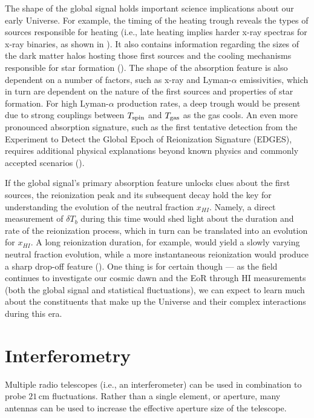 The shape of the global signal holds important science implications about our early Universe. For example, the timing of the heating trough reveals the types of sources responsible for heating (i.e., late heating implies harder x-ray spectras for x-ray binaries, as shown in \citet{fialkov_et_al2014}). It also contains information regarding the sizes of the dark matter halos hosting those first sources and the cooling mechanisms responsible for star formation (\citealt{fialkov_et_al2014b}). The shape of the absorption feature is also dependent on a number of factors, such as x-ray and Lyman-$\alpha$ emissivities, which in turn are dependent on the nature of the first sources and properties of star formation. For high Lyman-$\alpha$ production rates, a deep trough would be present due to strong couplings between $T_{\rm spin}$ and $T_{\rm gas}$ as the gas cools. An even more pronounced absorption signature, such as the first tentative detection from the Experiment to Detect the Global Epoch of Reionization Signature (EDGES), requires additional physical explanations beyond known physics and commonly accepted scenarios (\citealt{bowman_et_al2018}). 

If the global signal's primary absorption feature unlocks clues about the first sources, the reionization peak and its subsequent decay hold the key for understanding the evolution of the neutral fraction $x_{HI}$. Namely, a direct measurement of $\delta T_{b}$ during this time would shed light about the duration and rate of the reionization process, which in turn can be translated into an evolution for $x_{HI}$. A long reionization duration, for example, would yield a slowly varying neutral fraction evolution, while a more instantaneous reionization would produce a sharp drop-off feature (\citealt{pritchard_and_loeb2010}). One thing is for certain though --- as the field continues to investigate our cosmic dawn and the EoR through HI measurements (both the global signal and statistical fluctuations), we can expect to learn much about the constituents that make up the Universe and their complex interactions during this era.

\section{Interferometry}
\label{sec:interferometry}

Multiple radio telescopes (i.e., an interferometer) can be used in combination to probe $21$\,cm fluctuations. Rather than a single element, or aperture, many antennas can be used to increase the effective aperture size of the telescope.

